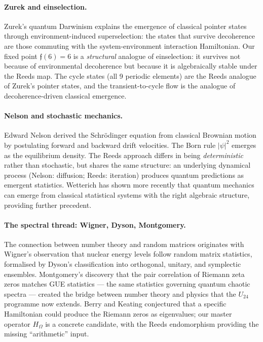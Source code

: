 \documentclass[12pt,a4paper]{article}
\theoremstyle{definition}
\theoremstyle{remark}
\newcommand{\Reeds}{\mathfrak{f}}
\newcommand{\HOmega}{H_\Omega}
\begin{document}
\paragraph{Zurek and einselection.}
Zurek's quantum Darwinism \cite{zurek2003, zurek2009} explains the emergence of
classical pointer states through environment-induced superselection: the states
that survive decoherence are those commuting with the system-environment
interaction Hamiltonian. Our fixed point $\Reeds(6) = 6$ is a \emph{structural}
analogue of einselection: it survives not because of environmental decoherence but
because it is algebraically stable under the Reeds map. The cycle states (all 9
periodic elements) are the Reeds analogue of Zurek's pointer states, and the
transient-to-cycle flow is the analogue of decoherence-driven classical emergence.

\paragraph{Nelson and stochastic mechanics.}
Edward Nelson \cite{nelson1966, nelson1985} derived the Schr\"odinger equation
from classical Brownian motion by postulating forward and backward drift
velocities. The Born rule $|\psi|^2$ emerges as the equilibrium density. The
Reeds approach differs in being \emph{deterministic} rather than stochastic, but
shares the same structure: an underlying dynamical process (Nelson: diffusion;
Reeds: iteration) produces quantum predictions as emergent statistics.
Wetterich \cite{wetterich2010} has shown more recently that quantum mechanics
can emerge from classical statistical systems with the right algebraic structure,
providing further precedent.

\paragraph{The spectral thread: Wigner, Dyson, Montgomery.}
The connection between number theory and random matrices originates with Wigner's
\cite{wigner1955} observation that nuclear energy levels follow random matrix
statistics, formalised by Dyson's \cite{dyson1962} classification into
orthogonal, unitary, and symplectic ensembles. Montgomery's \cite{montgomery1973}
discovery that the pair correlation of Riemann zeta zeros matches GUE statistics
--- the same statistics governing quantum chaotic spectra \cite{haake2010,
mehta2004, guhr1998} --- created the bridge between number theory and physics
that the $U_{24}$ programme now extends. Berry and Keating \cite{berry_keating1999}
conjectured that a specific Hamiltonian could produce the Riemann zeros as
eigenvalues; our master operator $\HOmega$ is a concrete candidate, with the
Reeds endomorphism providing the missing ``arithmetic'' input.
\end{document}
